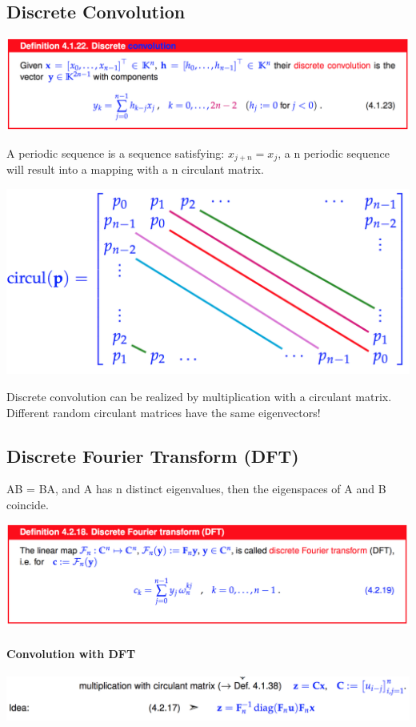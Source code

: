 \documentclass[12pt, a4paper]{article}
\begin{document}
\subsection{Discrete Convolution}
\begin{center}
	\includegraphics[width=380pt]{DescreteConvolution.png}
\end{center}
A periodic sequence is a sequence satisfying: $x_{j+n} = x_j$, a n periodic sequence will result into a mapping with a n circulant matrix.
\begin{center}
	\includegraphics[width=380pt]{circulantMatrix.png}
\end{center}
Discrete convolution can be realized by multiplication with a circulant matrix.\\
Different random circulant matrices have the same eigenvectors!
\subsection{Discrete Fourier Transform (DFT)}
AB = BA, and A has n distinct eigenvalues, then the eigenspaces of A and B coincide.
\begin{center}
	\includegraphics[width=380pt]{dft.png}
\end{center}
\paragraph{Convolution with DFT}
\begin{center}
	\includegraphics[width=380pt]{convDFT.png}
\end{center}
\end{document}
